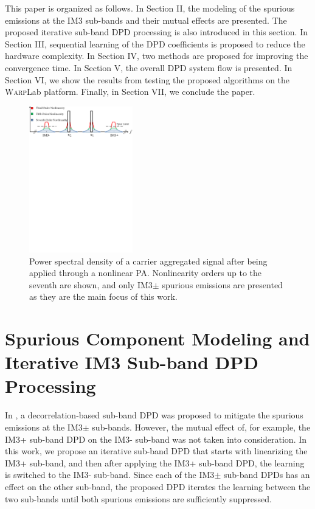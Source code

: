 This paper is organized as follows. In Section II, the modeling of the spurious emissions at the IM3 sub-bands and their mutual effects are presented. The proposed iterative sub-band DPD processing is also introduced in this section. In Section III, sequential learning of the DPD coefficients is proposed to reduce the hardware complexity. In Section IV, two methods are proposed for improving the convergence time. In Section V, the overall DPD system flow is presented. In Section VI, we show the results from testing the proposed algorithms on the \textsc{Warp}Lab platform. Finally, in Section VII, we conclude the paper.

\begin{figure}
	\centering
	\centerline{\includegraphics[width=0.4\textwidth]{./Figures/PSD.pdf}}
	\caption[]{Power spectral density of a carrier aggregated signal after being applied through a nonlinear PA. Nonlinearity orders up to the seventh are shown, and only IM3$\pm$ spurious emissions are presented as they are the main focus of this work.}
	\label{fig:PSD}
\end{figure}

\section{Spurious Component Modeling and Iterative IM3 Sub-band DPD Processing}
\label{sec:Analysis}
In \cite{ICASSP2014}, a decorrelation-based sub-band DPD was proposed to mitigate the spurious emissions at the IM3$\pm$ sub-bands. However, the mutual effect of, for example, the IM3+ sub-band DPD on the IM3- sub-band was not taken into consideration. In this work, we propose an iterative sub-band DPD that starts with linearizing the IM3+ sub-band, and then after applying the IM3+ sub-band DPD, the learning is switched to the IM3- sub-band. Since each of the IM3$\pm$ sub-band DPDs has an effect on the other sub-band, the proposed DPD iterates the learning between the two sub-bands until both spurious emissions are sufficiently suppressed.

